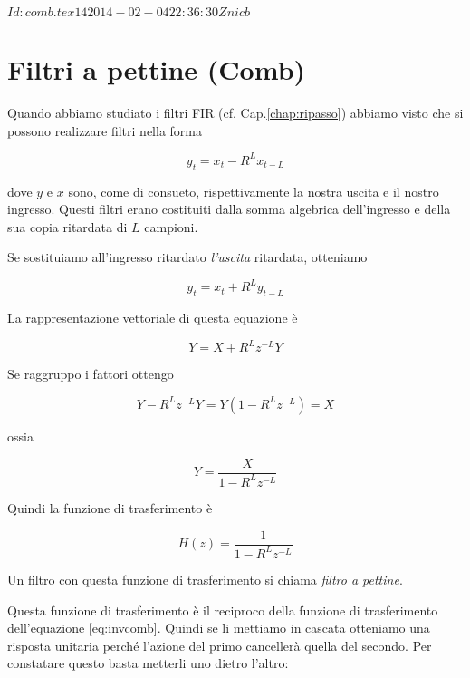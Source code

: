 %
%
\svnInfo $Id: comb.tex 14 2014-02-04 22:36:30Z nicb $

\chapter{Filtri a pettine (Comb)\label{chap:comb}}

Quando abbiamo studiato i filtri FIR (cf. Cap.\ref{chap:ripasso}) abbiamo
visto che si possono realizzare filtri nella forma

\begin{equation}\label{eq:invcomb}
  y_t = x_t - R^{L} x_{t-L}
\end{equation}

dove $y$ e $x$ sono, come di consueto, rispettivamente la nostra uscita e il
nostro ingresso. Questi filtri erano costituiti dalla somma algebrica
dell'ingresso e della sua copia ritardata di $L$ campioni.

Se sostituiamo all'ingresso ritardato \emph{l'uscita} ritardata, otteniamo

\begin{equation}
  y_t = x_t + R^{L} y_{t-L}
\end{equation}

La rappresentazione vettoriale di questa equazione \`e

\begin{equation}
  Y = X + R^{L} z^{-L} Y
\end{equation}

Se raggruppo i fattori ottengo

\begin{equation}
  Y - R^{L} z^{-L} Y = Y ( 1 - R^{L} z^{-L} ) = X
\end{equation}

ossia

\begin{equation}
  Y = \frac{X}{1 - R^{L} z^{-L}}
\end{equation}

Quindi la funzione di trasferimento \`e

\begin{equation}
 H ( z ) = \frac{1}{1 - R^{L} z^{-L}}
\end{equation}

Un filtro con questa funzione di trasferimento si chiama
\emph{filtro a pettine}.

Questa funzione di trasferimento \`e il reciproco della funzione di
trasferimento dell'equazione \ref{eq:invcomb}. Quindi se li mettiamo in 
cascata otteniamo una risposta unitaria perch\'e l'azione del primo
canceller\`a quella del secondo.
Per constatare questo basta metterli uno dietro l'altro:

